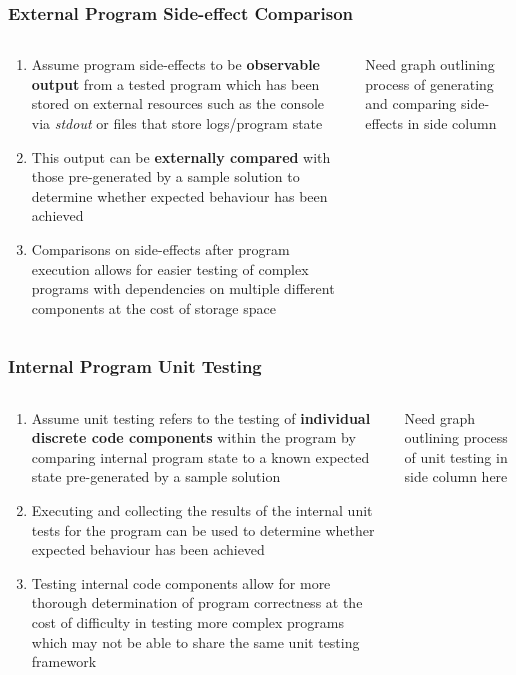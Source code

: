 \documentclass[xcolor]{beamer}
\begin{document}
\begin{frame}
	\frametitle{External Program Side-effect Comparison}
	\begin{columns}
		\begin{column}{0.7\textwidth}
			\begin{enumerate}
				\setlength\itemsep{0.75em}
				\item Assume program side-effects to be \textbf{observable output} from a tested program which has been stored on external resources such as the console via \textit{stdout} or files that store logs/program state
					\pause
				\item This output can be \textbf{externally compared} with those pre-generated by a sample solution to determine whether expected behaviour has been achieved
					\pause
				\item Comparisons on side-effects after program execution allows for easier testing of complex programs with dependencies on multiple different components at the cost of storage space
					\pause
			\end{enumerate}
		\end{column}
		\begin{column}{0.2\textwidth}
			Need graph outlining process of generating and comparing side-effects in side column
		\end{column}
	\end{columns}
\end{frame}
\begin{frame}
	\frametitle{Internal Program Unit Testing}
	\begin{columns}
		\begin{column}{0.7\textwidth}
			\begin{enumerate}
				\setlength\itemsep{0.75em}
				\item Assume unit testing refers to the testing of \textbf{individual discrete code components} within the program by comparing internal program state to a known expected state pre-generated by a sample solution
					\pause
				\item Executing and collecting the results of the internal unit tests for the program can be used to determine whether expected behaviour has been achieved
					\pause
				\item Testing internal code components allow for more thorough determination of program correctness at the cost of difficulty in testing more complex programs which may not be able to share the same unit testing framework
					\pause
			\end{enumerate}
		\end{column}
		\begin{column}{0.2\textwidth}
			Need graph outlining process of unit testing in side column here
		\end{column}
	\end{columns}
\end{frame}
\end{document}
